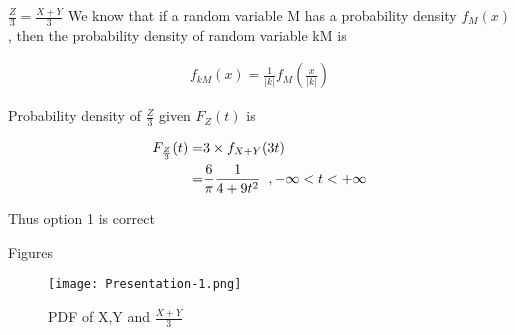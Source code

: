 \documentclass{beamer}
\providecommand{\brak}[1]{\ensuremath{\left(#1\right)}}
\providecommand{\abs}[1]{\vert#1\vert}
\begin{document}
\begin{frame}{$\frac{Z}{3} = \frac{X+Y}{3}$}
  We know that if a random variable M has a probability density $f_M(x)$, then the probability density of random variable kM is
  \begin{block}{}
    \begin{align}
      f_{kM}\brak{x} = \frac{1}{\abs{k}} f_M\brak{\frac{x}{\abs{k}}}
    \end{align}
  \end{block}
  Probability density of $\frac{Z}{3}$ given $F_Z(t)$ is
  \begin{block}{}
    \begin{align}
      F_{\frac{Z}{3}}(t) = & 3\times \displaystyle f_{X+Y}(3t)                                 \\
      =                    & \frac{6}{\pi} \frac{1}{4+9{t}^2}\hspace{0.2cm}, -\infty<t<+\infty
    \end{align}
    \begin{center}
      Thus option 1 is correct
    \end{center}
  \end{block}
\end{frame}
\begin{frame}{Figures}
  \begin{figure}[!]
    \centering
     \texttt{[image: Presentation-1.png]}
    \caption{PDF of X,Y and $\displaystyle\frac{X+Y}{3}$}
  \end{figure}
\end{frame}
\end{document}
